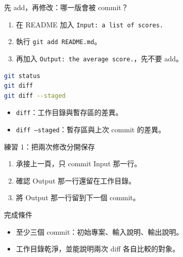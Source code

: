 \documentclass[xetex, unicode, 10pt, aspectratio=169]{beamer}
\begin{document}
\begin{frame}[fragile]{先 add，再修改：哪一版會被 commit？}
    \begin{enumerate}
        \item 在 README 加入 \texttt{Input: a list of scores.}
        \item 執行 \texttt{git add README.md}。
        \item 再加入 \texttt{Output: the average score.}，先不要 add。
    \end{enumerate}
\begin{lstlisting}[language=bash]
git status
git diff
git diff --staged
\end{lstlisting}
    \begin{itemize}
        \item \texttt{diff}：工作目錄與暫存區的差異。
        \item \texttt{diff --staged}：暫存區與上次 commit 的差異。
    \end{itemize}
\end{frame}

\begin{frame}{練習 1：把兩次修改分開保存}
    \begin{enumerate}
        \item 承接上一頁，只 commit Input 那一行。
        \item 確認 Output 那一行還留在工作目錄。
        \item 將 Output 那一行留到下一個 commit。
    \end{enumerate}
    \begin{block}{完成條件}
        \begin{itemize}
            \item 至少三個 commit：初始專案、輸入說明、輸出說明。
            \item 工作目錄乾淨，並能說明兩次 diff 各自比較的對象。
        \end{itemize}
    \end{block}
\end{frame}
\end{document}
